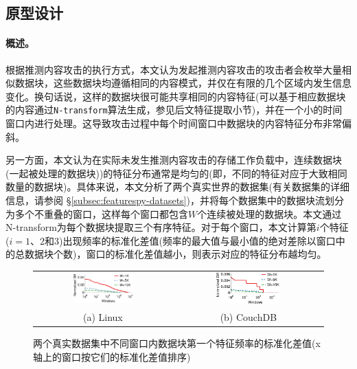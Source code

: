 \subsection{原型设计}
\label{subsec:featurespy-basic}

\paragraph*{概述。}

根据推测内容攻击的执行方式，本文认为发起推测内容攻击的攻击者会枚举大量相似数据块，这些数据块均遵循相同的内容模式，并仅在有限的几个区域内发生信息变化。换句话说，这样的数据块很可能共享相同的内容特征(可以基于相应数据块的内容通过{\tt N-transform}\cite{shilane12}算法生成，参见后文特征提取小节)，并在一个小的时间窗口内进行处理。这导致攻击过程中每个时间窗口中数据块的内容特征分布非常偏斜。

另一方面，本文认为在实际未发生推测内容攻击的存储工作负载中，连续数据块(一起被处理的数据块)\cite{zhu2008avoiding})的特征分布通常是均匀的(即，不同的特征对应于大致相同数量的数据块)。具体来说，本文分析了两个真实世界的数据集(有关数据集的详细信息，请参阅 \S\ref{subsec:featurespy-datasets})，并将每个数据集中的数据块流划分为多个不重叠的窗口，这样每个窗口都包含$W$个连续被处理的数据块。本文通过N-transform\cite{shilane12}为每个数据块提取三个有序特征。对于每个窗口，本文计算第$i$个特征($i=1$、$2$和$3$)出现频率的标准化差值(频率的最大值与最小值的绝对差除以窗口中的总数据块个数)，窗口的标准化差值越小，则表示对应的特征分布越均匀。

\begin{figure}[!htb]
    \centering
    \begin{tabular}{cc}
        \includegraphics[width=0.45\textwidth]{pic/featurespy/plot/featureDistribution/featureDistributionLinux.pdf} &
        \includegraphics[width=0.45\textwidth]{pic/featurespy/plot/featureDistribution/featureDistributionCouchbase.pdf}                    \\
        {\small (a) Linux}                                                                                           & {\small (b) CouchDB} \\
    \end{tabular}
    \caption{两个真实数据集中不同窗口内数据块第一个特征频率的标准化差值(x轴上的窗口按它们的标准化差值排序)}
    \label{fig:featurespy-featureDistribution}
\end{figure}


